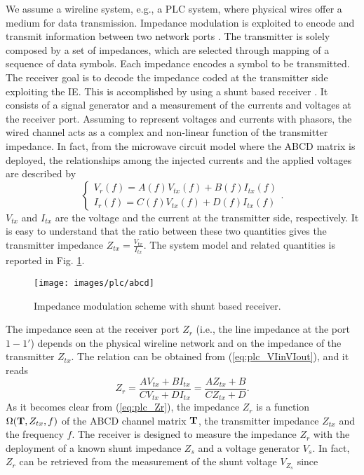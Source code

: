 We assume a wireline system, e.g., a PLC system, where physical wires offer a medium for data transmission. Impedance modulation is exploited to encode and transmit information between two network ports \cite{TonelloIsplc2020}. The transmitter is solely composed by a set of impedances, which are selected through mapping of a sequence of data symbols. Each impedance encodes a symbol to be transmitted. The receiver goal is to decode the impedance coded at the transmitter side exploiting the IE. This is accomplished by using a shunt based receiver \cite{TonelloIsplc2020}. It consists of a signal generator and a measurement of the currents and voltages at the receiver port.
Assuming to represent voltages and currents with phasors, the wired channel acts as a complex and non-linear function of the transmitter impedance. In fact, from the microwave circuit model where the ABCD matrix \cite{pozar}
is deployed, the relationships among the injected currents and the applied voltages are described by
\begin{equation}
	\begin{cases}
		V_{r}(f) = A(f)V_{tx}(f) + B(f)I_{tx}(f) \\
		I_{r}(f) = C(f)V_{tx}(f) + D(f)I_{tx}(f)
		\end{cases}.
	\label{eq:plc_VIinVIout}
\end{equation}
$V_{tx}$ and $I_{tx}$ are the voltage and the current at the transmitter side, respectively. It is easy to understand that the ratio between these two quantities gives the transmitter impedance $Z_{tx} = \frac{V_{tx}}{I_{tx}}$. The system model and related quantities is reported in Fig. \ref{fig:plc_abcd}.
\begin{figure}
	\texttt{[image: images/plc/abcd]}
	\caption{Impedance modulation scheme with shunt based receiver.}
	\label{fig:plc_abcd}
\end{figure}
The impedance seen at the receiver port $Z_{r}$ (i.e., the line impedance at the port $1-1'$) depends on the physical wireline network and on the impedance of the transmitter $Z_{tx}$. The relation can be obtained from (\ref{eq:plc_VIinVIout}), and it reads
\begin{equation}
	Z_{r} = \frac{AV_{tx}+BI_{tx}}{CV_{tx}+DI_{tx}} =  \frac{AZ_{tx}+B}{CZ_{tx}+D}.
	\label{eq:plc_Zr}
\end{equation}
As it becomes clear from (\ref{eq:plc_Zr}), the impedance $Z_{r}$ is a function $\Omega({\bold{T},Z_{tx},f})$ of the ABCD channel matrix $\bold{T}$, the transmitter impedance $Z_{tx}$ and the frequency $f$. The receiver is designed to measure the impedance $Z_{r}$ with the deployment of a known shunt impedance $Z_{s}$ and a voltage generator $V_{s}$. In fact, $Z_{r}$ can be retrieved from the measurement of the shunt voltage $V_{Z_s}$ since

